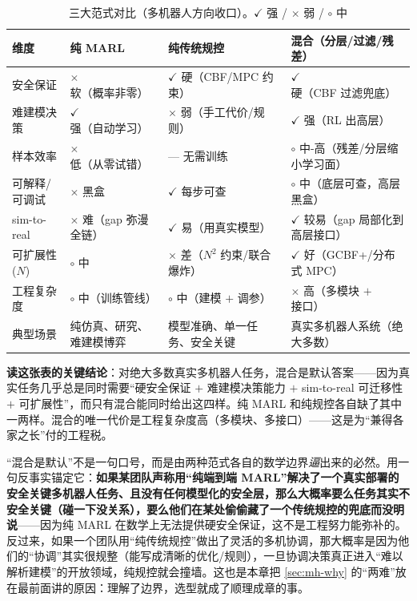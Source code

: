 \begin{table}[H]\centering\small
\caption{三大范式对比（多机器人方向收口）。$\checkmark$ 强 / $\times$ 弱 / $\circ$ 中}
\label{tab:mh-paradigm}
\begin{tabular}{p{2.6cm}p{3.0cm}p{3.2cm}p{4.0cm}}
\toprule
维度 & 纯 MARL & 纯传统规控 & 混合（分层/过滤/残差） \\
\midrule
安全保证 & $\times$ 软（概率非零） & $\checkmark$ 硬（CBF/MPC 约束） & $\checkmark$ 硬（CBF 过滤兜底） \\
难建模决策 & $\checkmark$ 强（自动学习） & $\times$ 弱（手工代价/规则） & $\checkmark$ 强（RL 出高层） \\
样本效率 & $\times$ 低（从零试错） & --- 无需训练 & $\circ$ 中-高（残差/分层缩小学习面） \\
可解释/可调试 & $\times$ 黑盒 & $\checkmark$ 每步可查 & $\circ$ 中（底层可查，高层黑盒） \\
sim-to-real & $\times$ 难（gap 弥漫全链） & $\checkmark$ 易（用真实模型） & $\checkmark$ 较易（gap 局部化到高层接口） \\
可扩展性($N$) & $\circ$ 中 & $\times$ 差（$N^2$ 约束/联合爆炸） & $\checkmark$ 好（GCBF+/分布式 MPC） \\
工程复杂度 & $\circ$ 中（训练管线） & $\circ$ 中（建模 $+$ 调参） & $\times$ 高（多模块 $+$ 接口） \\
典型场景 & 纯仿真、研究、难建模博弈 & 模型准确、单一任务、安全关键 & 真实多机器人系统（绝大多数） \\
\bottomrule
\end{tabular}
\end{table}

\noindent\textbf{读这张表的关键结论}：对绝大多数真实多机器人任务，混合是默认答案——因为真实任务几乎总是同时需要“硬安全保证 $+$ 难建模决策能力 $+$ sim-to-real 可迁移性 $+$ 可扩展性”，而只有混合能同时给出这四样。纯 MARL 和纯规控各自缺了其中一两样。混合的唯一代价是工程复杂度高（多模块、多接口）——这是为“兼得各家之长”付的工程税。

\begin{insight}
“混合是默认”不是一句口号，而是由两种范式各自的数学边界\emph{逼}出来的必然。用一句反事实锚定它：\textbf{如果某团队声称用“纯端到端 MARL”解决了一个真实部署的安全关键多机器人任务、且没有任何模型化的安全层，那么大概率要么任务其实不安全关键（碰一下没关系），要么他们在某处偷偷藏了一个传统规控的兜底而没明说}——因为纯 MARL 在数学上无法提供硬安全保证，这不是工程努力能弥补的。反过来，如果一个团队用“纯传统规控”做出了灵活的多机协调，那大概率是因为他们的“协调”其实很规整（能写成清晰的优化/规则），一旦协调决策真正进入“难以解析建模”的开放领域，纯规控就会撞墙。这也是本章把 \cref{sec:mh-why} 的“两难”放在最前面讲的原因：理解了边界，选型就成了顺理成章的事。
\end{insight}

